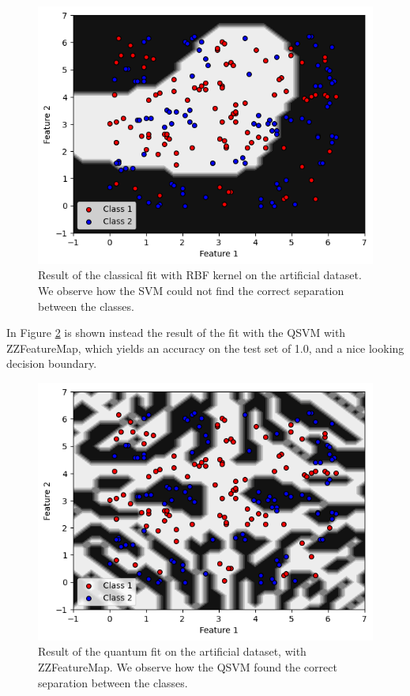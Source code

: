 \documentclass[a4paper]{article}
\begin{document}
\begin{figure}[h!]
    \centering
    \includegraphics[width=\textwidth]{images/adhocrbf.png}
    \caption{Result of the classical fit with RBF kernel on the artificial dataset. We observe how the SVM could not find the correct separation between the classes. }
    \label{fig:adhocrbf}
\end{figure}
In Figure \ref{fig:adhoczz} is shown instead the result of the fit with the QSVM with ZZFeatureMap, which yields an accuracy on the test set of 1.0, and a nice looking decision boundary. 
\begin{figure}[h!]
    \centering
    \includegraphics[width=\textwidth]{images/adhoczz.png}
    \caption{Result of the quantum fit on the artificial dataset, with ZZFeatureMap. We observe how the QSVM found the correct separation between the classes.}
    \label{fig:adhoczz}
\end{figure}
\end{document}
